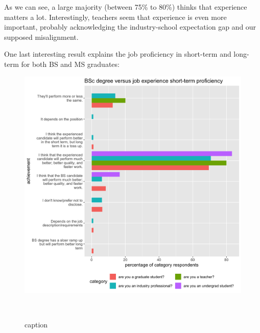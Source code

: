 \documentclass{sigchi}
\begin{document}
As we can see, a large majority (between 75\% to 80\%) thinks that experience matters a lot. Interestingly, teachers seem that experience is even more important, probably acknowledging the industry-school expectation gap and our supposed misalignment.

One last interesting result explains the job proficiency in short-term and long-term for both BS and MS graduates:

\begin{figure}
\includegraphics[scale=0.2]{../data-analysis/plots_output/BSc_degree_versus_job_experience_short-term_proficiency.png}
 \caption{caption}~\label{fig:figure8}
\end{figure}
\end{document}
